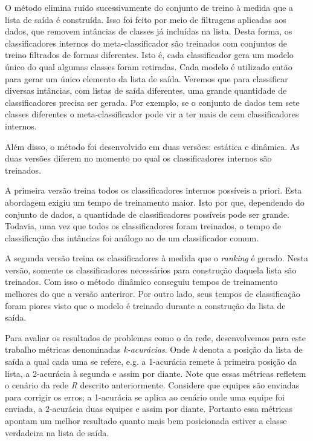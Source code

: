 O método elimina ruído sucessivamente do conjunto de treino à medida que a lista de saída é construída.
Isso foi feito por meio de filtragens aplicadas aos dados, que removem intâncias de classes já incluídas na lista.
Desta forma, os classificadores internos do meta-classificador são treinados com conjuntos de treino filtrados de formas diferentes.
Isto é, cada classificador gera um modelo único do qual algumas classes foram retiradas.
Cada modelo é utilizado então para gerar um único elemento da lista de saída.
Veremos que para classificar diversas intâncias, com listas de saída diferentes, uma grande quantidade de classificadores precisa ser gerada.
Por exemplo, se o conjunto de dados tem sete classes diferentes o meta-classificador pode vir a ter mais de cem classificadores internos.

Além disso, o método foi desenvolvido em duas versões: estática e dinâmica.
As duas versões diferem no momento no qual os classificadores internos são treinados.

A primeira versão treina todos os classificadores internos possíveis a priori.
Esta abordagem exigiu um tempo de treinamento maior.
Isto por que, dependendo do conjunto de dados, a quantidade de classificadores possíveis pode ser grande.
Todavia, uma vez que todos os classificadores foram treinados, o tempo de classificação das intâncias foi análogo ao de um classificador comum.

A segunda versão treina os classificadores à medida que o \textit{ranking} é gerado.
Nesta versão, somente os classificadores necessários para construção daquela lista são treinados.
Com isso o método dinâmico conseguiu tempos de treinamento melhores do que a versão anteriror.
Por outro lado, seus tempos de classificação foram piores visto que o modelo é treinado durante a construção da lista de saída.

Para avaliar os resultados de problemas como o da rede, desenvolvemos para este trabalho métricas denominadas \textit{k-acurácias}.
Onde \textit{k} denota a posição da lista de saída a qual cada uma se refere, e.g. a 1-acurácia remete à primeira posição da lista, a 2-acurácia à segunda e assim por diante.
Note que essas métricas refletem o cenário da rede \textit{R} descrito anteriormente.
Considere que equipes são enviadas para corrigir os erros; a 1-acurácia se aplica ao cenário onde uma equipe foi enviada, a 2-acurácia duas equipes e assim por diante.
Portanto essa métricas apontam um melhor resultado quanto mais bem posicionada estiver a classe verdadeira na lista de saída.

